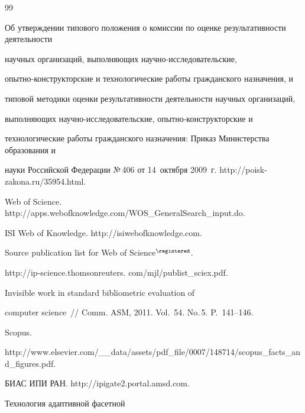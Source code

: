 {{\begin{thebibliography}{99}


Об утверждении типового положения о комиссии по оценке результативности деятельности


научных организаций, выполняющих научно-исследовательские,


опыт\-но-кон\-ст\-рук\-тор\-ские и технологические работы граж\-дан\-ско\-го назначения, и


типовой методики оценки результативности деятельности научных организаций,


вы\-пол\-ня\-ющих на\-уч\-но-ис\-сле\-до\-ва\-тель\-ские, опыт\-но-кон\-ст\-рук\-тор\-ские и


технологические работы граж\-дан\-ско\-го назначения: Приказ Министерства образования и


науки Российской Федерации №\,406 от 14~октября 2009~г. {\sf http://poisk-zakona.ru/35954.html}.







Web of Science. {\sf http://apps.webofknowledge.com/WOS\_GeneralSearch\_input.do}.




ISI Web of Knowledge. {\sf http://isiwebofknowledge.com}.




Source publication list for Web of Science$^\registered$.


{\sf http://ip-science.thomsonreuters. com/mjl/publist\_sciex.pdf}.




 Invisible work in standard bibliometric evaluation of


computer science~/\!\!/ Comm. ASM, 2011. Vol.~54. No.\,5. P.~141--146.




Scopus.


{\sf http://www.elsevier.com/\_\_data/assets/pdf\_file/0007/148714/scopus\_facts\_\linebreak and\_figures.pdf}.







БИАС ИПИ РАН. {\sf http://ipigate2.portal.amsd.com}.




 Технология адаптивной фасетной



\end{thebibliography}}}
